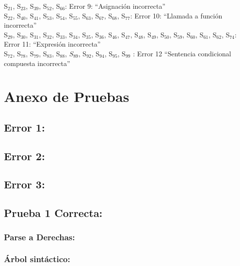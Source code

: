 \documentclass[a4paper, 12pt]{article}
\begin{document}
S$_{21}$, S$_{23}$, S$_{39}$, S$_{52}$, S$_{66}$: Error 9: “Asignación incorrecta” \\

S$_{22}$, S$_{40}$, S$_{41}$, S$_{53}$, S$_{54}$, S$_{55}$, S$_{63}$, S$_{67}$, S$_{68}$, S$_{77}$: Error 10: “Llamada a función incorrecta”\\

S$_{29}$, S$_{30}$, S$_{31}$, S$_{32}$, S$_{33}$, S$_{34}$, S$_{35}$, S$_{36}$, S$_{46}$, S$_{47}$, S$_{48}$, S$_{49}$, S$_{50}$, S$_{59}$, S$_{60}$, S$_{61}$, S$_{62}$, S$_{74}$: Error 11: “Expresión incorrecta”\\

S$_{72}$, S$_{78}$, S$_{79}$, S$_{83}$, S$_{88}$, $S_{89}$, S$_{92}$, S$_{94}$, S$_{95}$, S$_{99}$ : Error 12 “Sentencia condicional compuesta incorrecta” \\


\section{Anexo de Pruebas}
\subsection*{Error 1:}



\subsection*{Error 2:}



\subsection*{Error 3:}



\subsection*{Prueba 1 Correcta:}

\subsubsection*{Parse a Derechas:}

\subsubsection*{Árbol sintáctico:}
\end{document}
